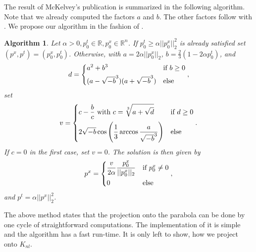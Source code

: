 \documentclass[abstracton]{scrreprt}
\newtheorem{algorithm}[theorem]{Algorithm}
\begin{document}
            The result of McKelvey's publication is summarized in the following algorithm. Note that we already computed the factors $a$ and $b$. The other factors follow with \cite{kelvey-ajp}. We propose our algorithm in the fashion of \cite{strekalovskiy-et-al-siims14}.
                \begin{algorithm}
                    \label{alg:projection_on_parabola}
                    Let $\alpha > 0, p_{0}^{t} \in \mathbb{R}, p_{0}^{x} \in \mathbb{R}^{n}$. If $p_{0}^{t} \ge \alpha ||p_{0}^{x}||_{2}^{2}$ is already satisfied set $(p^{x}, p^{t}) = (p_{0}^{x}, p_{0}^{t})$. Otherwise, with $a = 2 \alpha ||p_{0}^{x}||_{2}$, $b = \frac{2}{3} (1 - 2 \alpha p_{0}^{t})$, and
                        \[
                            d =
                                \begin{dcases*}
                                    a^{2} + b^{3} & \textnormal{if $b \ge 0$}\\
                                    (a - \sqrt{-b}^{3})(a + \sqrt{-b}^{3}) & \textnormal{else}
                                \end{dcases*},
                        \]
                    set
                        \[
                            v =
                                \begin{dcases*}
                                    c - \frac{b}{c} \,\, \textnormal{with} \,\, c = \sqrt[3]{a + \sqrt{d}} & \textnormal{if $d \ge 0$}\\
                                    2 \sqrt{-b} \cos \left( \frac{1}{3} \arccos \frac{a}{\sqrt{-b}^{3}} \right) & \textnormal{else}
                                \end{dcases*}.
                        \]
                    If $c = 0$ in the first case, set $v = 0$. The solution is then given by
                        \[
                            p^{x} =
                                \begin{dcases*}
                                    \frac{v}{2\alpha} \frac{p_{0}^{x}}{||p_{0}^{x}||_{2}} & \textnormal{if $p_{0}^{x} \ne 0$}\\
                                    0 & \textnormal{else}
                                \end{dcases*},
                        \]
                    and $p^{t} = \alpha ||p^{x}||_{2}^{2}$.
                \end{algorithm}
            The above method states that the projection onto the parabola can be done by one cycle of straightforward computations. The implementation of it is simple and the algorithm has a fast run-time. It is only left to show, how we project onto $K_{nl}$.
\end{document}
